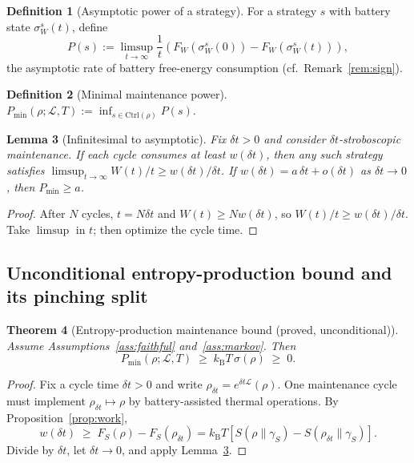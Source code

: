 \documentclass[11pt,a4paper]{article}
\theoremstyle{plain}
\newtheorem{theorem}{Theorem}[section]
\newtheorem{lemma}[theorem]{Lemma}
\theoremstyle{definition}
\newtheorem{definition}[theorem]{Definition}
\theoremstyle{remark}
\newcommand{\kB}{k_{\mathrm{B}}}
\newcommand{\Ctrl}{\mathrm{Ctrl}}
\newcommand{\Pmin}{P_{\min}}
\begin{document}
\begin{definition}[Asymptotic power of a strategy]
For a strategy $s$ with battery state $\sigma_W^s(t)$, define
\begin{equation}
P(s) := \limsup_{t\to\infty} \frac{1}{t}
\left(F_W(\sigma_W^s(0)) - F_W(\sigma_W^s(t))\right),
\end{equation}
the asymptotic rate of battery free-energy consumption
(cf.\ Remark~\ref{rem:sign}).
\end{definition}

\begin{definition}[Minimal maintenance power]
$\displaystyle \Pmin(\rho; \mathcal{L}, T) := \inf_{s\in\Ctrl(\rho)} P(s)$.
\end{definition}

\begin{lemma}[Infinitesimal to asymptotic]\label{lem:strobo}
Fix $\delta t > 0$ and consider $\delta t$-stroboscopic maintenance. If each
cycle consumes at least $w(\delta t)$, then any such strategy satisfies
$\limsup_{t\to\infty} W(t)/t \ge w(\delta t)/\delta t$. If
$w(\delta t) = a\,\delta t + o(\delta t)$ as $\delta t \to 0$, then
$\Pmin \ge a$.
\end{lemma}

\begin{proof}
After $N$ cycles, $t = N\delta t$ and $W(t) \ge N w(\delta t)$, so
$W(t)/t \ge w(\delta t)/\delta t$. Take $\limsup$ in $t$; then optimize the
cycle time.
\end{proof}

\subsection{Unconditional entropy-production bound and its pinching split}

\begin{theorem}[Entropy-production maintenance bound (proved, unconditional)]
\label{thm:sigma}
Assume Assumptions~\ref{ass:faithful} and~\ref{ass:markov}. Then
\begin{equation}
\Pmin(\rho; \mathcal{L}, T) \;\ge\; \kB T\, \sigma(\rho) \;\ge\; 0.
\end{equation}
\end{theorem}

\begin{proof}
Fix a cycle time $\delta t > 0$ and write $\rho_{\delta t} =
e^{\delta t\mathcal{L}}(\rho)$. One maintenance cycle must implement
$\rho_{\delta t} \mapsto \rho$ by battery-assisted thermal operations. By
Proposition~\ref{prop:work},
\begin{equation}
w(\delta t) \;\ge\; F_S(\rho) - F_S(\rho_{\delta t})
= \kB T\left[S(\rho\|\gamma_S) - S(\rho_{\delta t}\|\gamma_S)\right].
\end{equation}
Divide by $\delta t$, let $\delta t \to 0$, and apply
Lemma~\ref{lem:strobo}.
\end{proof}
\end{document}
